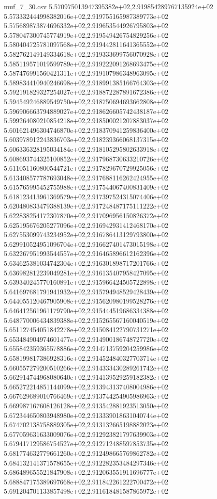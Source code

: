 \begin{filecontents*}{muf_7_30.csv}
5.570975013947395382e+02,2.919854289767135924e+02
5.573332444998382016e+02,2.919755165987389773e+02
5.575689873874696332e+02,2.919653544926795803e+02
5.578047300745774919e+02,2.919549426754829256e+02
5.580404725781097568e+02,2.919442811641365552e+02
5.582762149149334618e+02,2.919333699756070928e+02
5.585119571019599789e+02,2.919222091268693475e+02
5.587476991560421311e+02,2.919107986348963095e+02
5.589834410940246698e+02,2.918991385166764303e+02
5.592191829327254027e+02,2.918872287891672386e+02
5.594549246889549750e+02,2.918750694693662808e+02
5.596906663794889027e+02,2.918626605742438187e+02
5.599264080210854218e+02,2.918500021207883037e+02
5.601621496304746870e+02,2.918370941259836400e+02
5.603978912243836703e+02,2.918239366068137315e+02
5.606336328195034184e+02,2.918105295802633918e+02
5.608693744325100852e+02,2.917968730633210726e+02
5.611051160800544721e+02,2.917829670729925056e+02
5.613408577787693048e+02,2.917688116262424955e+02
5.615765995452755988e+02,2.917544067400831409e+02
5.618123413961369579e+02,2.917397524315074406e+02
5.620480833479388139e+02,2.917248487175111222e+02
5.622838254172307870e+02,2.917096956150826372e+02
5.625195676205277096e+02,2.916942931412468170e+02
5.627553099743234952e+02,2.916786413129793800e+02
5.629910524951096704e+02,2.916627401473015198e+02
5.632267951993544557e+02,2.916465896612162396e+02
5.634625381034742304e+02,2.916301898717201766e+02
5.636982812239049281e+02,2.916135407958427095e+02
5.639340245770160891e+02,2.915966424505722898e+02
5.641697681791941932e+02,2.915794948529428439e+02
5.644055120467905908e+02,2.915620980199528276e+02
5.646412561961179790e+02,2.915444519686334388e+02
5.648770006434839388e+02,2.915265567160040519e+02
5.651127454051842278e+02,2.915084122790731271e+02
5.653484904974601477e+02,2.914900186748727720e+02
5.655842359365578886e+02,2.914713759204259986e+02
5.658199817386928316e+02,2.914524840327703714e+02
5.660557279200510266e+02,2.914333430289261742e+02
5.662914744968080640e+02,2.914139529259182382e+02
5.665272214851144099e+02,2.913943137408004986e+02
5.667629689010766469e+02,2.913744254905986963e+02
5.669987167608126128e+02,2.913542881923513050e+02
5.672344650803948980e+02,2.913339018631040744e+02
5.674702138758889305e+02,2.913132665198882023e+02
5.677059631633009076e+02,2.912923821797639903e+02
5.679417129586754527e+02,2.912712488597853735e+02
5.681774632779661260e+02,2.912498665769862782e+02
5.684132141371578655e+02,2.912282353484297346e+02
5.686489655521847908e+02,2.912063551911696777e+02
5.688847175389697668e+02,2.911842261222700472e+02
5.691204701133857498e+02,2.911618481587865972e+02

\end{filecontents*}
